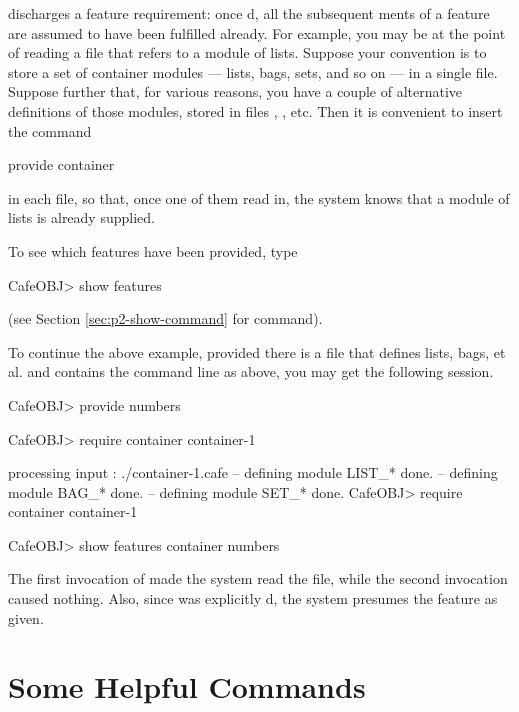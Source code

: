\documentclass[a4paper]{memoir}
\begin{document}
 discharges a feature
requirement: once d, all the subsequent
ments of a feature are assumed to have been fulfilled
already.
For example, you may be
at the point of reading a file that refers to a module of
lists. Suppose your convention is to store a set of container modules
--- lists, bags, sets, and so on --- in a single file. Suppose further
that, for various
reasons, you have a couple of alternative definitions of those modules,
stored in files , , etc.
Then it is convenient to insert the command
\begin{vvtm}
\begin{ccode}
  provide container
\end{ccode}
\end{vvtm}
in each file, so that, once one of them read in, the system knows
that a module of lists is already supplied.

To see which features have been provided, type
\begin{vvtm}
\begin{ccode}
  CafeOBJ> show features
\end{ccode}
\end{vvtm}
(see Section \ref{sec:p2-show-command} for  command).

To continue the above example, provided there is a file
 that
defines lists, bags, et al. and contains the  command line
as above, you may get the following session.
\begin{vvtm}
\begin{ccode}
  CafeOBJ> provide numbers

  CafeOBJ> require container container-1
  
  processing input : ./container-1.cafe
  -- defining module LIST_* done.
  -- defining module BAG_* done.
  -- defining module SET_* done.
  CafeOBJ> require container container-1

  CafeOBJ> show features
  container numbers
\end{ccode}
\end{vvtm}
The first invocation of  made the system read the file,
while the second invocation caused nothing.
Also, since  was
explicitly d, the system presumes the feature as given.

\section{Some Helpful Commands}\label{sec:p2-other-toplevels}
\end{document}
